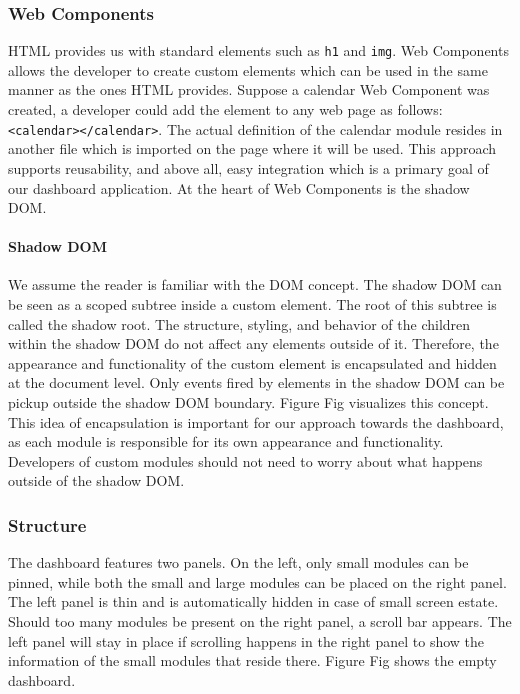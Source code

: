         \subsubsection{Web Components}
        
        HTML provides us with standard elements such as \texttt{h1} and \texttt{img}. Web Components allows the developer to create custom elements which can be used in the same manner as the ones HTML provides. Suppose a calendar Web Component was created, a developer could add the element to any web page as follows: \texttt{<calendar></calendar>}. The actual definition of the calendar module resides in another file which is imported on the page where it will be used. This approach supports reusability, and above all, easy integration which is a primary goal of our dashboard application. At the heart of Web Components is the shadow DOM\@.

        \paragraph{Shadow DOM} We assume the reader is familiar with the DOM concept. The shadow DOM can be seen as a scoped subtree inside a custom element. The root of this subtree is called the shadow root. The structure, styling, and behavior of the children within the shadow DOM do not affect any elements outside of it. Therefore, the appearance and functionality of the custom element is encapsulated and hidden at the document level. Only events fired by elements in the shadow DOM can be pickup outside the shadow DOM boundary. Figure Fig visualizes this concept. This idea of encapsulation is important for our approach towards the dashboard, as each module is responsible for its own appearance and functionality. Developers of custom modules should not need to worry about what happens outside of the shadow DOM\@.

        \subsubsection{Structure}\label{dashboard_structure}

        The dashboard features two panels. On the left, only small modules can be pinned, while both the small and large modules can be placed on the right panel. The left panel is thin and is automatically hidden in case of small screen estate. Should too many modules be present on the right panel, a scroll bar appears. The left panel will stay in place if scrolling happens in the right panel to show the information of the small modules that reside there. Figure Fig shows the empty dashboard.

